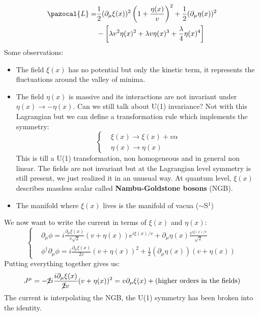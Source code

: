 \documentclass[../main.tex]{subfiles}
\begin{document}
\begin{example}
\begin{align*}
\pazocal{L}=&\frac{1}{2}(\partial_\mu\xi(x))^2\left(1+\frac{\eta(x)}{v}\right)^2+\frac{1}{2}(\partial_\mu\eta(x))^2\\
&-\left[\lambda v^2\eta(x)^2+\lambda v\eta(x)^3+\frac{\lambda}{4}\eta(x)^4\right]
\end{align*}
Some observations:
\begin{itemize}
    \item The field $\xi(x)$ has no potential but only the kinetic term, it represents the fluctuations around the valley of minima.
    \item The field $\eta(x)$ is massive and its interactions are not invariant under $\eta(x)\to-\eta(x)$. Can we still talk about U(1) invariance? Not with this Lagrangian but we can define a transformation rule which implements the symmetry:
    \[
    \left\{
    \begin{aligned}
    &\xi(x)\to\xi(x)+v\alpha\\
    &\eta(x)\to\eta(x)
    \end{aligned}
    \right.
    \]
    This is till a U(1) transformation, non homogeneous and in general non linear. The fields are not invariant but at the Lagrangian level symmetry is still present, we just realized it in an unusual way. At quantum level, $\xi(x)$ describes massless scalar called \textbf{Nambu-Goldstone bosons} (NGB).
    \item The manifold where $\xi(x)$ lives is the manifold of vacua ($\sim$S$^1$)
\end{itemize}
We now want to write the current in terms of $\xi(x)$ and $\eta(x)$:
\[
\left\{
\begin{aligned}
&\partial_\mu\phi=i\frac{\partial_\mu\xi(x)}{v\sqrt{2}}(v+\eta(x))e^{i\xi(x)/v}+\partial_\mu\eta(x)\frac{e^{i\xi(x)/v}}{\sqrt{2}}\\
&\phi^\dagger\partial_\mu\phi=i\frac{\partial_\mu\xi(x)}{2v}(v+\eta(x))^2+\frac{1}{2}(\partial_\mu\eta(x))(v+\eta(x))
\end{aligned}
\right.
\]
Putting everything together gives us:
\[
J^\mu=-\cancel{2}i\frac{i\partial_\mu\xi(x)}{\cancel{2}v}(v+\eta(x))^2=v\partial_\mu\xi(x)+(\text{higher orders in the fields})
\]
The current is interpolating the NGB, the U(1) symmetry has been broken into the identity.
\end{example}
\end{document}
